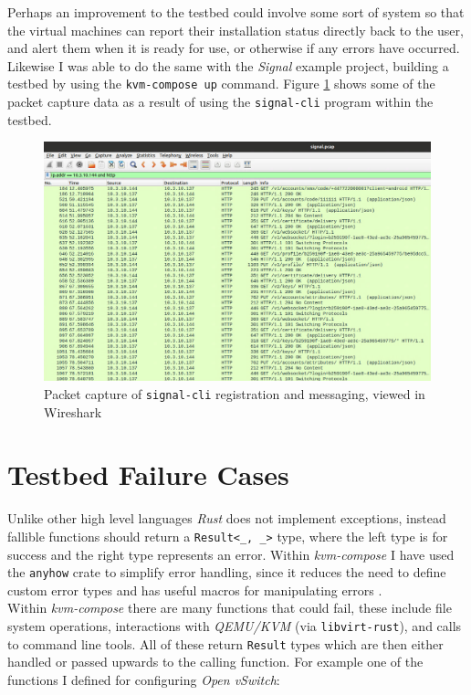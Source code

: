 \documentclass[
    author={Jacob Daniel Halsey},
    supervisor={Prof. Awais Rashid},
    degree={BSc},
    title={Building a Testbed for Evaluating Privacy Enhancing Technologies  (PETs)},
    subtitle={},
    type={software development},
    year={2021}
]{dissertation}
\begin{document}
Perhaps an improvement to the testbed could
involve some sort of system so that the virtual machines can report their installation status
directly back to the user, and alert them when it is ready for use, or otherwise if any errors have occurred. \\

Likewise I was able to do the same with the \emph{Signal} example project, building a testbed by using the
\texttt{kvm-compose up} command. Figure \ref{fig:signal_capture} shows some of the packet capture data
as a result of using the \texttt{signal-cli} program within the testbed.

\begin{figure}
	\centering
	\includegraphics[width=16cm]{img/signal_capture}
	\caption{Packet capture of \texttt{signal-cli} registration and messaging, viewed in Wireshark}
	\label{fig:signal_capture}
\end{figure}

\section{Testbed Failure Cases}
\label{sect:failure}

Unlike other high level languages \emph{Rust} does not implement exceptions, instead fallible
functions should return a \lstinline|Result<_, _>| type, where the left type is for success
and the right type represents an error. Within \emph{kvm-compose} I have used the \texttt{anyhow} 
crate to simplify error handling, since it reduces the need to define custom error types
and has useful macros for manipulating errors \cite{groenen}. \\

Within \emph{kvm-compose} there are many functions that could fail, these include file system
operations, interactions with \emph{QEMU/KVM} (via \texttt{libvirt-rust}), and calls to command
line tools. All of these return \lstinline|Result| types which are then either handled
or passed upwards to the calling function. For example one of the functions I defined for 
configuring \emph{Open vSwitch}: \\
\end{document}
